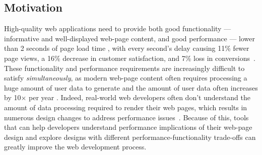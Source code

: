 \label{sec:intro}

\subsection{Motivation}
High-quality web applications need to provide both good functionality 
--- informative and well-displayed web-page content, 
and good performance --- lower than 2 seconds of page load
time \cite{nah2004study}, with every second's delay causing 11\% fewer page views, a 16\% decrease in customer satisfaction, and 7\% loss in conversions~\cite{onesecond}. 
These functionality and performance requirements are 
increasingly difficult to satisfy {\it simultaneously}, as modern web-page content
often requires processing a huge amount of 
user data to generate and the amount of user data often increases by 10$\times$ per year \cite{startup}. 
Indeed, real-world web developers often don't understand the amount of data processing required to render their web pages, which results in numerous design changes to address performance issues~\cite{yang:icse18:hloop}.
Because of this, tools that can help developers understand
performance implications of their web-page design and explore designs
with different performance-functionality trade-offs can greatly improve the web development process.


\iffalse
Even worse, web applications are often highly modularized,
with data maintenance (model), web-page displays (view), and control logic
(controller) separately designed and implemented, making holistic performance 
understanding and optimization difficult. \cong{Isn't it just inter-procedure analysis? Why is it difficult?}
\fi




